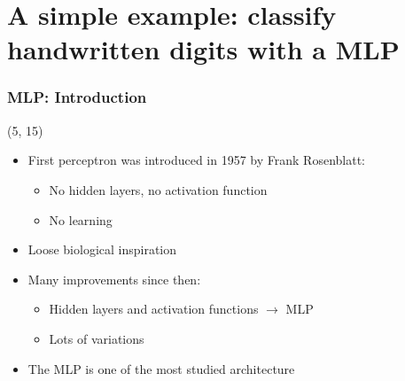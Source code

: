 \section[A simple example: MLP]{A simple example: classify handwritten digits with a \acl{MLP}}

\begin{frame}

  \frametitle{\acl{MLP}: Introduction}

  \begin{textblock}{55}(5, 15)
    \begin{itemize}
    \item<1-> First perceptron was introduced in 1957 by Frank Rosenblatt:
      \begin{itemize}
      \item No hidden layers, no activation function
      \item No learning
      \end{itemize}
    \item<2-> Loose biological inspiration
    \item<3-> Many improvements since then:
      \begin{itemize}
      \item Hidden layers and activation functions $\rightarrow$ \ac{MLP}
      \item Lots of variations
      \end{itemize}
    \item<4-> The \ac{MLP} is one of the most studied architecture
    \end{itemize}
  \end{textblock}


\end{frame}
